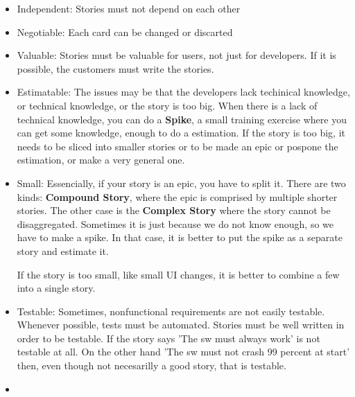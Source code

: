 \documentclass[a4paper,12pt]{article}
\begin{document}
\begin{itemize}
\item Independent: Stories must not depend on each other
\item Negotiable: Each card can be changed or discarted
\item Valuable: Stories must be valuable for users, not just for developers. If it is possible, the customers must write the stories.
\item Estimatable: The issues may be that the developers lack techinical knowledge, or technical knowledge, or the story is too big. When there is a lack of technical knowledge, you can do a \textbf{Spike}, a small training exercise where you can get some knowledge, enough to do a estimation. If the story is too big, it needs to be sliced into smaller stories or to be made an epic or pospone the estimation, or make a very general one.
\item Small: Essencially, if your story is an epic, you have to split it. There are two kinds: \textbf{Compound Story}, where the epic is comprised by multiple shorter stories. The other case is the \textbf{Complex Story} where the story cannot be disaggregated. Sometimes it is just because we do not know enough, so we have to make a spike. In that case, it is better to put the spike as a separate story and estimate it.

  If the story is too small, like small UI changes, it is better to combine a few into a single story.

\item Testable: Sometimes, nonfunctional requirements are not easily testable.  Whenever possible, tests must be automated. Stories must be well written in order to be testable. If the story says 'The sw must always work' is not testable at all. On the other hand 'The sw must not crash 99 percent at start' then, even though not necesarilly a good story, that is testable.
\item 
\end{itemize}
\end{document}
